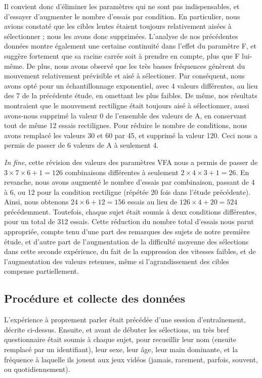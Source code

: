 	Il convient donc d'éliminer les paramètres qui ne sont pas indispensables, et d'essayer d'augmenter le nombre d'essais par condition. En particulier, nous avions constaté que les cibles lentes étaient toujours relativement aisées à sélectionner ; nous les avons donc supprimées. L'analyse de nos précédentes données montre également une certaine continuité dans l'effet du paramètre F, et suggère fortement que sa racine carrée soit à prendre en compte, plus que F lui-même. De plus, nous avons observé que les très basses fréquences génèrent du mouvement relativement prévisible et aisé à sélectioner. Par conséquent, nous avons opté pour un échantillonnage exponentiel, avec 4 valeurs différentes, au lieu des 7 de la précédente étude, en omettant les plus faibles. De même, nos résultats montraient que le mouvement rectiligne était toujours aisé à sélectionner, aussi avons-nous supprimé la valeur 0 de l'ensemble des valeurs de A, en conservant tout de même 12 essais rectilignes. Pour réduire le nombre de conditions, nous avons remplacé les valeurs 30 et 60 par 45, et supprimé la valeur 120. Ceci nous a permis de passer de 6 valeurs de A à seulement 4.
	
	\emph{In fine}, cette révision des valeurs des paramètres VFA nous a permis de passer de $3\times{}7\times{}6+1=126$ combinaisons différentes à seulement $2\times{}4\times{}3+1=26$. En revanche, nous avons augmenté le nombre d'essais par combinaison, passant de 4 à 6, ou 12 pour la condition rectiligne (répétée 20 fois dans l'étude précédente). Ainsi, nous obtenons $24\times{}6+12=156$ essais au lieu de $126\times{}4+20=524$ précédemment. Toutefois, chaque sujet était soumis à deux conditions différentes, pour un total de 312 essais. Cette réduction du nombre total d'essais nous parut appropriée, compte tenu d'une part des remarques des sujets de notre première étude, et d'autre part de l'augmentation de la difficulté moyenne des sélections dans cette seconde expérience, du fait de la suppression des vitesses faibles, et de l'augmentation des valeurs retenues, même si l'agrandissement des cibles compense partiellement.
	
	\subsection{Procédure et collecte des données}
	L'expérience à proprement parler était précédée d'une session d'entraînement, décrite ci-dessus. Ensuite, et avant de débuter les sélections, un très bref questionnaire était soumis à chaque sujet, pour recueillir leur nom (ensuite remplacé par un identifiant), leur sexe, leur âge, leur main dominante, et la fréquence à laquelle ils jouent aux jeux vidéos (jamais, rarement, parfois, souvent, ou quotidiennement).
	
